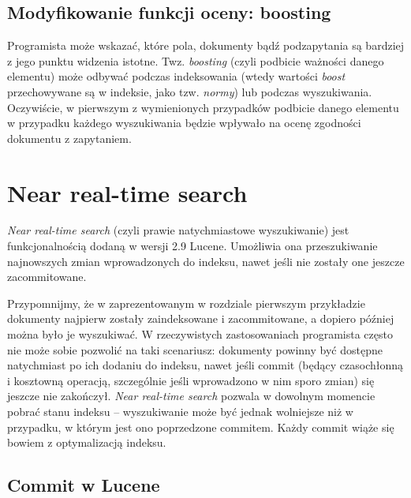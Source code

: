 \subsection{Modyfikowanie funkcji oceny: boosting}
\label{sec:boosting}

Programista może wskazać, które pola, dokumenty bądź podzapytania są bardziej z jego punktu widzenia istotne. Twz. \emph{boosting} (czyli podbicie ważności danego elementu) może odbywać podczas indeksowania (wtedy wartości \emph{boost} przechowywane są w indeksie, jako tzw. \emph{normy}) lub podczas wyszukiwania. Oczywiście, w pierwszym z wymienionych przypadków podbicie danego elementu w przypadku każdego wyszukiwania będzie wpływało na ocenę zgodności dokumentu z zapytaniem.

\section{Near real-time search}

\emph{Near real-time search} (czyli prawie natychmiastowe wyszukiwanie) jest funkcjonalnością dodaną w wersji 2.9 Lucene. Umożliwia ona przeszukiwanie najnowszych zmian wprowadzonych do indeksu, nawet jeśli nie zostały one jeszcze zacommitowane. 

Przypomnijmy, że w zaprezentowanym w rozdziale pierwszym przykładzie dokumenty najpierw zostały zaindeksowane i zacommitowane, a dopiero później można było je wyszukiwać. W rzeczywistych zastosowaniach programista często nie może sobie pozwolić na taki scenariusz: dokumenty powinny być dostępne natychmiast po ich dodaniu do indeksu, nawet jeśli commit (będący czasochłonną i kosztowną operacją, szczególnie jeśli wprowadzono w nim sporo zmian) się jeszcze nie zakończył. \emph{Near real-time search} pozwala w dowolnym momencie pobrać stanu indeksu -- wyszukiwanie może być jednak wolniejsze niż w przypadku, w którym jest ono poprzedzone commitem. Każdy commit wiąże się bowiem z optymalizacją indeksu.

\subsection{Commit w Lucene}


